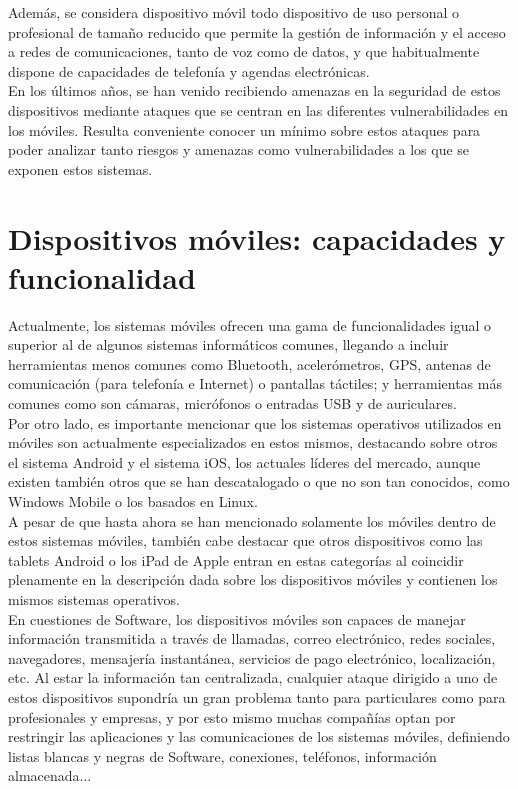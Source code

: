 \documentclass[11pt]{article}
\begin{document}
{Además, se considera dispositivo móvil todo dispositivo de uso personal o profesional de tamaño reducido que permite la gestión de información y el acceso a redes de comunicaciones, tanto de voz como de datos, y que habitualmente dispone de capacidades de telefonía y agendas electrónicas.} \\

{En los últimos años, se han venido recibiendo amenazas en la seguridad de estos dispositivos mediante ataques que se centran en las diferentes vulnerabilidades en los móviles. Resulta conveniente conocer un mínimo sobre estos ataques para poder analizar tanto riesgos y amenazas como vulnerabilidades a los que se exponen estos sistemas.}

\section{Dispositivos móviles: capacidades y funcionalidad}

{Actualmente, los sistemas móviles ofrecen una gama de funcionalidades igual o superior al de algunos sistemas informáticos comunes, llegando a incluir herramientas menos comunes como Bluetooth, acelerómetros, GPS, antenas de comunicación (para telefonía e Internet) o pantallas táctiles; y herramientas más comunes como son cámaras, micrófonos o entradas USB y de auriculares.} \\

{Por otro lado, es importante mencionar que los sistemas operativos utilizados en móviles son actualmente especializados en estos mismos, destacando sobre otros el sistema Android y el sistema iOS, los actuales líderes del mercado, aunque existen también otros que se han descatalogado o que no son tan conocidos, como Windows Mobile o los basados en Linux.} \\

\newpage
{A pesar de que hasta ahora se han mencionado solamente los móviles dentro de estos sistemas móviles, también cabe destacar que otros dispositivos como las tablets Android o los iPad de Apple entran en estas categorías al coincidir plenamente en la descripción dada sobre los dispositivos móviles y contienen los mismos sistemas operativos.} \\

{En cuestiones de Software, los dispositivos móviles son capaces de manejar información transmitida a través de llamadas, correo electrónico, redes sociales, navegadores, mensajería instantánea, servicios de pago electrónico, localización, etc. Al estar la información tan centralizada, cualquier ataque dirigido a uno de estos dispositivos supondría un gran problema tanto para particulares como para profesionales y empresas, y por esto mismo muchas compañías optan por restringir las aplicaciones y las comunicaciones de los sistemas móviles, definiendo listas blancas y negras de Software, conexiones, teléfonos, información almacenada...}
\end{document}
